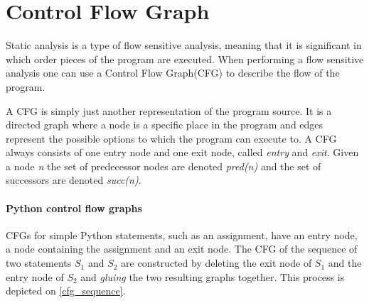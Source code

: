 \section{Control Flow Graph}\label{control_flow_graph}
Static analysis is a type of flow sensitive analysis, meaning that it is significant in which order pieces of the program are executed.
When performing a flow sensitive analysis one can use a Control Flow Graph(CFG) to describe the flow of the program.

A CFG is simply just another representation of the program source.
It is a directed graph where a node is a specific place in the program and edges represent the possible options to which the program can execute to.
A CFG always consists of one entry node and one exit node, called \textit{entry} and \textit{exit}.
Given a node \textit{n} the set of predecessor nodes are denoted \textit{pred(n)} and the set of successors are denoted \textit{succ(n)}.

\paragraph{Python control flow graphs}
CFGs for simple Python statements, such as an assignment, have an entry node, a node containing the assignment and an exit node.
The CFG of the sequence of two statements $S_1$ and $S_2$ are constructed by deleting the exit node of $S_1$ and the entry node of $S_2$ and \emph{gluing} the two resulting graphs together.
This process is depicted on \cref{cfg_sequence}.


